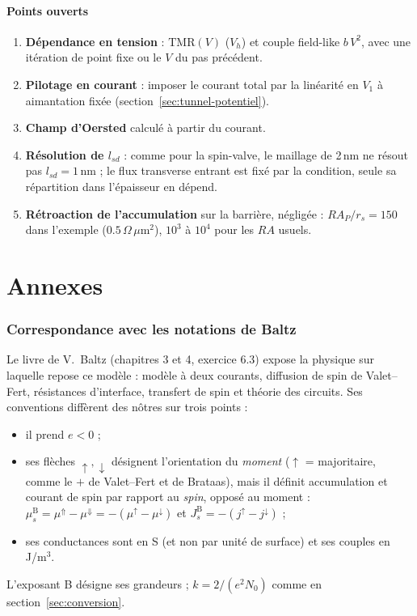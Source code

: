\documentclass[11pt,a4paper]{article}
\begin{document}
\subsection{Points ouverts}

\begin{enumerate}
  \item \textbf{Dépendance en tension} : $\mathrm{TMR}(V)$ ($V_h$) et couple
    field-like $b\,V^2$, avec une itération de point fixe ou le $V$ du pas
    précédent.
  \item \textbf{Pilotage en courant} : imposer le courant total par la
    linéarité en $V_1$ à aimantation fixée (section~\ref{sec:tunnel-potentiel}).
  \item \textbf{Champ d'Oersted} calculé à partir du courant.
  \item \textbf{Résolution de $l_{sd}$} : comme pour la spin-valve, le
    maillage de 2\,nm ne résout pas $l_{sd} = 1$\,nm ; le flux transverse
    entrant est fixé par la condition, seule sa répartition dans
    l'épaisseur en dépend.
  \item \textbf{Rétroaction de l'accumulation} sur la barrière, négligée :
    $RA_P/r_s = 150$ dans l'exemple ($0.5\,\Omega\,\mu$m$^2$), $10^3$ à
    $10^4$ pour les $RA$ usuels.
\end{enumerate}

\part*{Annexes}

\section*{Correspondance avec les notations de Baltz}
\label{sec:baltz}

Le livre de V.~Baltz (chapitres 3 et 4, exercice 6.3) expose la physique
sur laquelle repose ce modèle : modèle à deux courants, diffusion de spin de
Valet--Fert, résistances d'interface, transfert de spin et théorie des
circuits. Ses conventions diffèrent des nôtres sur trois points :
\begin{itemize}
  \item il prend $e<0$ ;
  \item ses flèches $\uparrow,\downarrow$ désignent l'orientation du
    \emph{moment} ($\uparrow$ = majoritaire, comme le $+$ de Valet--Fert et
    de Brataas), mais il définit accumulation et courant de spin par
    rapport au \emph{spin}, opposé au moment :
    $\mu_s^{\mathrm{B}} = \mu^\Uparrow-\mu^\Downarrow = -(\mu^\uparrow-\mu^\downarrow)$
    et $J_s^{\mathrm{B}} = -(j^\uparrow-j^\downarrow)$ ;
  \item ses conductances sont en S (et non par unité de surface) et ses
    couples en J/m$^3$.
\end{itemize}
L'exposant B désigne ses grandeurs ; $k = 2/(e^2N_0)$ comme en
section~\ref{sec:conversion}.
\end{document}
